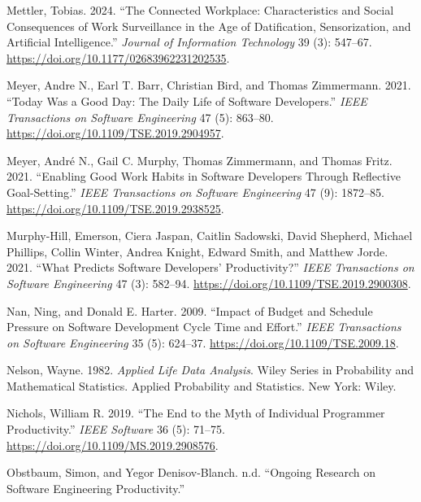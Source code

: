 \documentclass[
]{article}
\newlength{\cslhangindent}
\newenvironment{CSLReferences}[2] %
 {\begin{list}{}{%
  \setlength{\itemindent}{0pt}
  \setlength{\leftmargin}{0pt}
  \setlength{\parsep}{0pt}
  \ifodd #1
   \setlength{\leftmargin}{\cslhangindent}
   \setlength{\itemindent}{-1\cslhangindent}
  \fi
  \setlength{\itemsep}{#2\baselineskip}}}
 {\end{list}}
\begin{document}
\begin{CSLReferences}{1}{0}
Mettler, Tobias. 2024. {``The Connected Workplace: {Characteristics} and
Social Consequences of Work Surveillance in the Age of Datification,
Sensorization, and Artificial Intelligence.''} \emph{Journal of
Information Technology} 39 (3): 547--67.
\url{https://doi.org/10.1177/02683962231202535}.

Meyer, Andre N., Earl T. Barr, Christian Bird, and Thomas Zimmermann.
2021. {``Today {Was} a {Good Day}: {The Daily Life} of {Software
Developers}.''} \emph{IEEE Transactions on Software Engineering} 47 (5):
863--80. \url{https://doi.org/10.1109/TSE.2019.2904957}.

Meyer, André N., Gail C. Murphy, Thomas Zimmermann, and Thomas Fritz.
2021. {``Enabling {Good Work Habits} in {Software Developers} Through
{Reflective Goal-Setting}.''} \emph{IEEE Transactions on Software
Engineering} 47 (9): 1872--85.
\url{https://doi.org/10.1109/TSE.2019.2938525}.

Murphy-Hill, Emerson, Ciera Jaspan, Caitlin Sadowski, David Shepherd,
Michael Phillips, Collin Winter, Andrea Knight, Edward Smith, and
Matthew Jorde. 2021. {``What {Predicts Software Developers}'
{Productivity}?''} \emph{IEEE Transactions on Software Engineering} 47
(3): 582--94. \url{https://doi.org/10.1109/TSE.2019.2900308}.

Nan, Ning, and Donald E. Harter. 2009. {``Impact of {Budget} and
{Schedule Pressure} on {Software Development Cycle Time} and
{Effort}.''} \emph{IEEE Transactions on Software Engineering} 35 (5):
624--37. \url{https://doi.org/10.1109/TSE.2009.18}.

Nelson, Wayne. 1982. \emph{Applied Life Data Analysis}. Wiley Series in
Probability and Mathematical Statistics. {Applied} Probability and
Statistics. New York: Wiley.

Nichols, William R. 2019. {``The {End} to the {Myth} of {Individual
Programmer Productivity}.''} \emph{IEEE Software} 36 (5): 71--75.
\url{https://doi.org/10.1109/MS.2019.2908576}.

Obstbaum, Simon, and Yegor Denisov-Blanch. n.d. {``Ongoing {Research} on
{Software Engineering Productivity}.''}


\end{CSLReferences}
\end{document}

